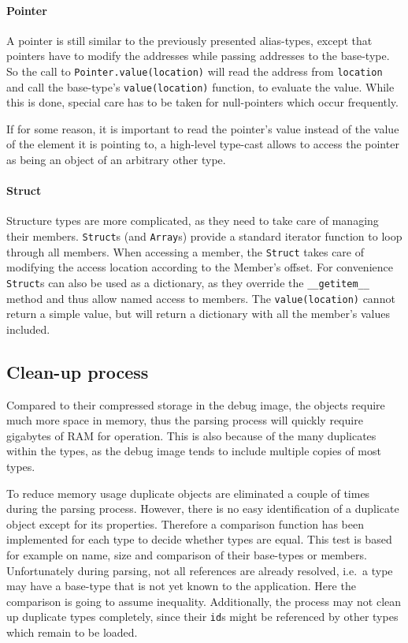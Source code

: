 \paragraph{Pointer} A pointer is still similar to the previously presented alias-types, except that pointers
    have to modify the addresses while passing addresses to the base-type.
    So the call to \texttt{Pointer.value(location)} will read the address from \texttt{location} and call the base-type’s
    \texttt{value(location)} function, to evaluate the value.
    While this is done, special care has to be taken for null-pointers which occur frequently.
    
    If for some reason, it is important to read the pointer’s value instead of the value of the element it is pointing to,
    a high-level type-cast allows to access the pointer as being an object of an arbitrary other type.

\paragraph{Struct} Structure types are more complicated, as they need to take care of managing their members.
    \texttt{Struct}s (and \texttt{Array}s) provide a standard iterator function to loop through all members. When accessing a member,
    the \texttt{Struct} takes care of modifying the access location according to the Member’s offset.
    For convenience \texttt{Struct}s can also be used as a dictionary, as they override the \texttt{\_\_getitem\_\_} method 
    and thus allow named access to members. The \texttt{value(location)} cannot return a simple value, but will return
    a dictionary with all the member’s values included.

\subsection{Clean-up process}
Compared to their compressed storage in the debug image, the objects require much more space in memory, thus the parsing process will quickly require gigabytes of RAM for operation.
This is also because of the many duplicates within the types, as the debug image tends to include multiple copies of most types.

To reduce memory usage duplicate objects are eliminated a couple of times during the parsing process. However, there is no easy identification of a duplicate object except for its properties. Therefore a comparison function has been implemented for each type to decide whether types are equal. This test is based for example on name, size and comparison of their base-types or members. Unfortunately during parsing, not all references are already resolved, i.e.~a type may have a base-type that is not yet known to the application. Here the comparison is going to assume inequality.
Additionally, the process may not clean up duplicate types completely, 
since their \texttt{id}s might be referenced by other types which remain to be loaded.

